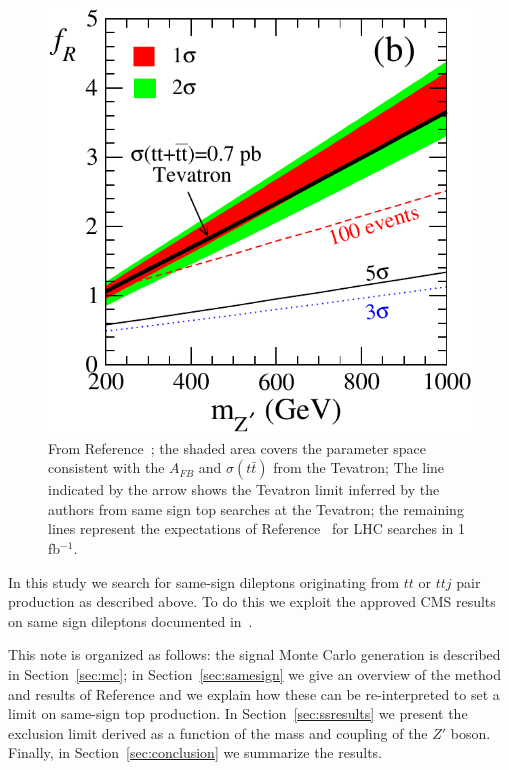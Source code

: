 \begin{figure}[htb]
\begin{center}
\includegraphics[width=0.6\linewidth]{figs/berger_limit.pdf}
\caption{\protect From Reference~\cite{berger}; the shaded area covers the parameter
space consistent with the $A_{FB}$ and $\sigma(t\bar{t})$ from the Tevatron;
The line indicated by the arrow shows the Tevatron limit inferred by the authors
from same sign top searches at the Tevatron; the remaining lines represent the
expectations of Reference~\cite{berger}
for LHC searches in 1 fb$^{-1}$. \label{fig:berger_limit}}
\end{center}
\end{figure}

In this study we search for same-sign dileptons originating from $tt$ 
or $ttj$ pair production as described above.
To do this we exploit the approved CMS results on same sign dileptons documented in~\cite{ssnote1, sspaper}.

This note is organized as follows: 
the signal Monte Carlo generation is described in Section~\ref{sec:mc};
in Section~\ref{sec:samesign} we give an overview of the method and results of Reference \cite{sspaper}
and we explain how these can be re-interpreted to set a limit on same-sign top production.
In Section~\ref{sec:ssresults} we present the exclusion limit derived 
as a function of the mass and coupling of the $Z'$ boson.
Finally, in Section~\ref{sec:conclusion} we summarize the results.  

